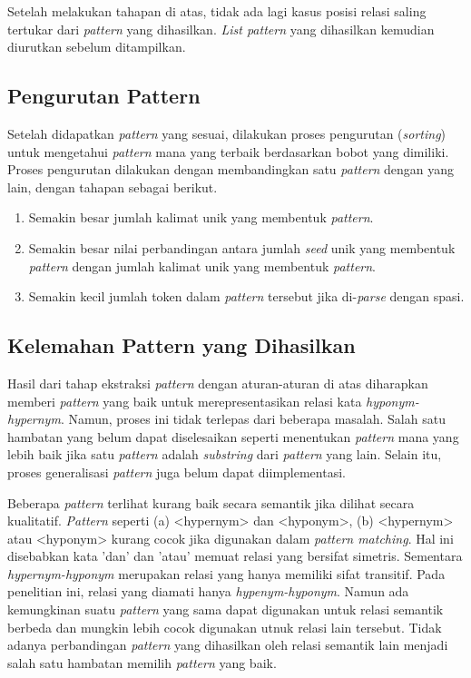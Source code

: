 Setelah melakukan tahapan di atas, tidak ada lagi kasus posisi relasi saling tertukar dari \textit{pattern} yang dihasilkan. \textit{List pattern} yang dihasilkan kemudian diurutkan sebelum ditampilkan.

\subsection{Pengurutan Pattern}
Setelah didapatkan \textit{pattern} yang sesuai, dilakukan proses pengurutan (\textit{sorting}) untuk mengetahui \textit{pattern} mana yang terbaik berdasarkan bobot yang dimiliki. Proses pengurutan dilakukan dengan membandingkan satu \textit{pattern} dengan yang lain, dengan tahapan sebagai berikut.
\begin{enumerate}
  \item Semakin besar jumlah kalimat unik yang membentuk \textit{pattern}.
  \item Semakin besar nilai perbandingan antara jumlah \textit{seed} unik yang membentuk \textit{pattern} dengan jumlah kalimat unik yang membentuk \textit{pattern}.
  \item Semakin kecil jumlah token dalam \textit{pattern} tersebut jika di-\textit{parse} dengan spasi.
\end{enumerate}

\subsection{Kelemahan Pattern yang Dihasilkan}
Hasil dari tahap ekstraksi \textit{pattern} dengan aturan-aturan di atas diharapkan memberi \textit{pattern} yang baik untuk merepresentasikan relasi kata \textit{hyponym-hypernym}. Namun, proses ini tidak terlepas dari beberapa masalah. Salah satu hambatan yang belum dapat diselesaikan seperti menentukan \textit{pattern} mana yang lebih baik jika satu \textit{pattern} adalah \textit{substring} dari \textit{pattern} yang lain. Selain itu, proses generalisasi \textit{pattern} juga belum dapat diimplementasi. 

Beberapa \textit{pattern} terlihat kurang baik secara semantik jika dilihat secara kualitatif. \textit{Pattern} seperti (a) <hypernym> dan <hyponym>, (b) <hypernym> atau <hyponym> kurang cocok jika digunakan dalam \textit{pattern matching}. Hal ini disebabkan kata 'dan' dan 'atau' memuat relasi yang bersifat simetris. Sementara \textit{hypernym-hyponym} merupakan relasi yang hanya memiliki sifat transitif. Pada penelitian ini, relasi yang diamati hanya \textit{hypenym-hyponym}. Namun ada kemungkinan suatu \textit{pattern} yang sama dapat digunakan untuk relasi semantik berbeda dan mungkin lebih cocok digunakan utnuk relasi lain tersebut. Tidak adanya perbandingan \textit{pattern} yang dihasilkan oleh relasi semantik lain menjadi salah satu hambatan memilih \textit{pattern} yang baik.


